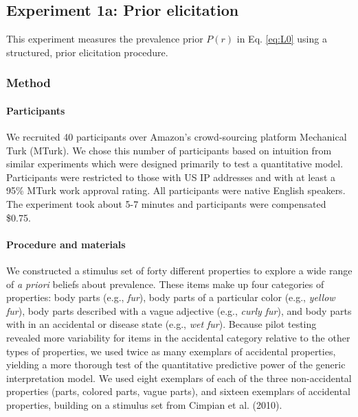 \documentclass[floatsintext,man]{apa6}
\theoremstyle{definition}
\theoremstyle{definition}
\theoremstyle{definition}
\theoremstyle{remark}
\begin{document}
\subsection{Experiment 1a: Prior
elicitation}\label{experiment-1a-prior-elicitation}

This experiment measures the prevalence prior \(P(r)\) in Eq.
\ref{eq:L0} using a structured, prior elicitation procedure.

\subsubsection{Method}\label{method}

\paragraph{Participants}\label{participants}

We recruited 40 participants over Amazon's crowd-sourcing platform
Mechanical Turk (MTurk). We chose this number of participants based on
intuition from similar experiments which were designed primarily to test
a quantitative model. Participants were restricted to those with US IP
addresses and with at least a 95\% MTurk work approval rating. All
participants were native English speakers. The experiment took about 5-7
minutes and participants were compensated \$0.75.

\paragraph{Procedure and materials}\label{procedure-and-materials}

We constructed a stimulus set of forty different properties to explore a
wide range of \emph{a priori} beliefs about prevalence. These items make
up four categories of properties: body parts (e.g., \emph{fur}), body
parts of a particular color (e.g., \emph{yellow fur}), body parts
described with a vague adjective (e.g., \emph{curly fur}), and body
parts with in an accidental or disease state (e.g., \emph{wet fur}).
Because pilot testing revealed more variability for items in the
accidental category relative to the other types of properties, we used
twice as many exemplars of accidental properties, yielding a more
thorough test of the quantitative predictive power of the generic
interpretation model. We used eight exemplars of each of the three
non-accidental properties (parts, colored parts, vague parts), and
sixteen exemplars of accidental properties, building on a stimulus set
from Cimpian et al. (2010).
\end{document}
